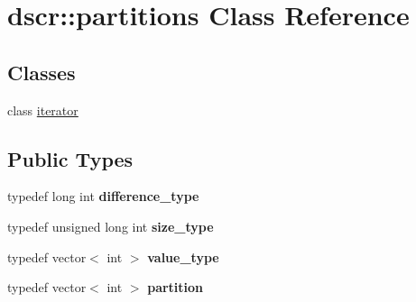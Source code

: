 \hypertarget{classdscr_1_1partitions}{\section{dscr\-:\-:partitions Class Reference}
\label{classdscr_1_1partitions}
}
\subsection*{Classes}
\begin{DoxyCompactItemize}
\item 
class \hyperlink{classdscr_1_1partitions_1_1iterator}{iterator}
\end{DoxyCompactItemize}
\subsection*{Public Types}
\begin{DoxyCompactItemize}
\item 
\hypertarget{classdscr_1_1partitions_a62f30b2e7ed25bbbecd2f118d338736b}{typedef long int {\bfseries difference\-\_\-type}}\label{classdscr_1_1partitions_a62f30b2e7ed25bbbecd2f118d338736b}

\item 
\hypertarget{classdscr_1_1partitions_aa87a95dffc52286e56e8dedb8255b464}{typedef unsigned long int {\bfseries size\-\_\-type}}\label{classdscr_1_1partitions_aa87a95dffc52286e56e8dedb8255b464}

\item 
\hypertarget{classdscr_1_1partitions_abe1f65e11c2aaa291ffe00141bc3a187}{typedef vector$<$ int $>$ {\bfseries value\-\_\-type}}\label{classdscr_1_1partitions_abe1f65e11c2aaa291ffe00141bc3a187}

\item 
\hypertarget{classdscr_1_1partitions_ac70cbab80535c5bc530f0258c45fc553}{typedef vector$<$ int $>$ {\bfseries partition}}\label{classdscr_1_1partitions_ac70cbab80535c5bc530f0258c45fc553}

\end{DoxyCompactItemize}
